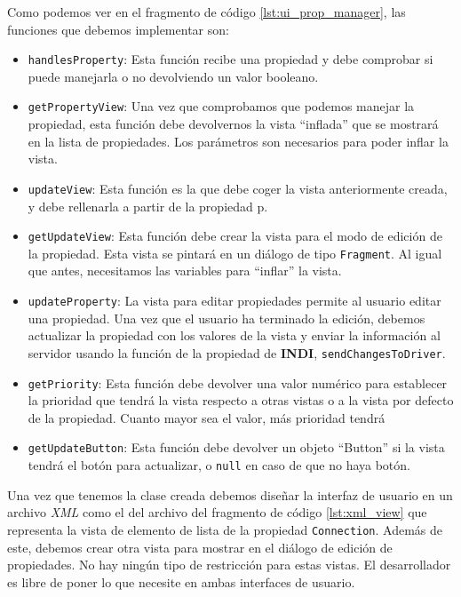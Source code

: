 \bigskip
Como podemos ver en el fragmento de código \ref{lst:ui_prop_manager}, las funciones que debemos implementar son:

\begin{itemize}
  \item \texttt{handlesProperty}:
  Esta función recibe una propiedad y debe comprobar si puede manejarla o no devolviendo un valor booleano.

  \item \texttt{getPropertyView}:
  Una vez que comprobamos que podemos manejar la propiedad, esta función debe devolvernos la vista ``inflada'' que se mostrará en la lista de propiedades. Los parámetros  son necesarios para poder inflar la vista.

  \item \texttt{updateView}:
  Esta función es la que debe coger la vista anteriormente creada, y debe rellenarla a partir de la propiedad p.

  \item \texttt{getUpdateView}:
  Esta función debe crear la vista para el modo de edición de la propiedad. Esta vista se pintará en un diálogo de tipo \texttt{Fragment}. Al igual que antes, necesitamos las variables  para ``inflar'' la vista.

  \item \texttt{updateProperty}:
  La vista para editar propiedades permite al usuario editar una propiedad. Una vez que el usuario ha terminado la edición, debemos actualizar la propiedad con los valores de la vista y enviar la información al servidor usando la función de la propiedad de \textbf{INDI}, \texttt{sendChangesToDriver}. 

  \item \texttt{getPriority}:
  Esta función debe devolver una valor numérico para establecer la prioridad que tendrá la vista respecto a otras vistas o a la vista por defecto de la propiedad. Cuanto mayor sea el valor, más prioridad tendrá

  \item \texttt{getUpdateButton}:
  Esta función debe devolver un objeto ``Button'' si la vista tendrá el botón para actualizar, o \texttt{null} en caso de que no haya botón.
\end{itemize}

\bigskip
Una vez que tenemos la clase creada debemos diseñar la interfaz de usuario en un archivo \textit{XML} como el del archivo del fragmento de código \ref{lst:xml_view} que representa la vista de elemento de lista de la propiedad \texttt{Connection}. Además de este, debemos crear otra vista para mostrar en el diálogo de edición de propiedades. No hay ningún tipo de restricción para estas vistas. El desarrollador es libre de poner lo que necesite en ambas interfaces de usuario.

